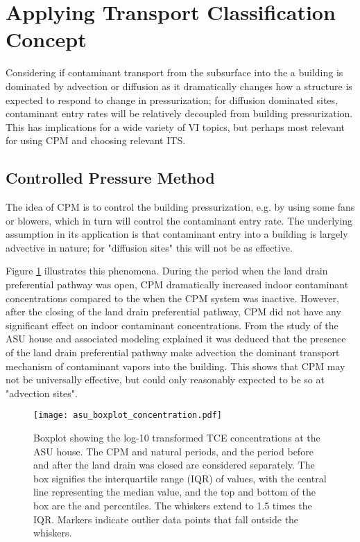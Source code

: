 \section{Applying Transport Classification Concept}

Considering if contaminant transport from the subsurface into the a building is dominated by advection or diffusion as it dramatically changes how a structure is expected to respond to change in pressurization; for diffusion dominated sites, contaminant entry rates will be relatively decoupled from building pressurization.
This has implications for a wide variety of VI topics, but perhaps most relevant for using CPM and choosing relevant ITS.\par

\subsection{Controlled Pressure Method}

The idea of CPM is to control the building pressurization, e.g. by using some fans or blowers, which in turn will control the contaminant entry rate.
The underlying assumption in its application is that contaminant entry into a building is largely advective in nature; for "diffusion sites" this will not be as effective.\par

Figure \ref{fig:cpm_adv_diff} illustrates this phenomena.
During the period when the land drain preferential pathway was open, CPM dramatically increased indoor contaminant concentrations compared to the when the CPM system was inactive.
However, after the closing of the land drain preferential pathway, CPM did not have any significant effect on indoor contaminant concentrations.
From the study of the ASU house and associated modeling explained it was deduced that the presence of the land drain preferential pathway make advection the dominant transport mechanism of contaminant vapors into the building.
This shows that CPM may not be universally effective, but could only reasonably expected to be so at "advection sites".\par

\begin{figure}[htb!]
  \centering
  \texttt{[image: asu\_boxplot\_concentration.pdf]}
  \caption{Boxplot showing the log-10 transformed TCE concentrations at the ASU house. The CPM and natural periods, and the period before and after the land drain was closed are considered separately. The box signifies the interquartile range (IQR) of values, with the central line representing the median value, and the top and bottom of the box are the  and  percentiles. The whiskers extend to 1.5 times the IQR. Markers indicate outlier data points that fall outside the whiskers.}
  \label{fig:cpm_adv_diff}
\end{figure}

